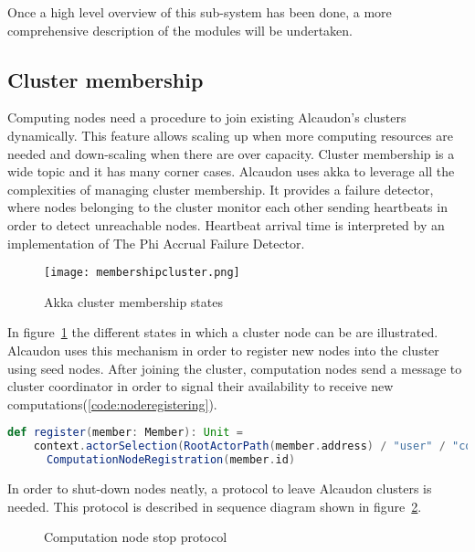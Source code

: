 Once a high level overview of this sub-system has been done, a more
comprehensive description of the modules will be undertaken.

\subsection{Cluster membership}

Computing nodes need a procedure to join existing Alcaudon's clusters
dynamically. This feature allows scaling up when more computing resources are
needed and down-scaling when there are over capacity. Cluster membership is a
wide topic and it has many corner cases. Alcaudon uses akka to leverage all the
complexities of managing cluster membership. It provides a failure detector,
where nodes belonging to the cluster monitor each other sending heartbeats in
order to detect unreachable nodes. Heartbeat arrival time is interpreted by an
implementation of The Phi Accrual Failure Detector\cite{phifailure}.

\begin{figure}[!h]
\begin{center}
\texttt{[image: membershipcluster.png]}
\caption{Akka cluster membership states\cite{akkastates}}
\label{fig:statescluster}
\end{center}
\end{figure}

In figure~\ref{fig:statescluster} the different states in which a cluster node
can be are illustrated. Alcaudon uses this mechanism in order to register new
nodes into the cluster using seed nodes. After joining the cluster, computation
nodes send a message to cluster coordinator in order to signal their
availability to receive new computations(\ref{code:noderegistering}).

\begin{lstlisting}[language=scala, frame=trBL, label=code:noderegistering, float=ht, caption = {Compute node registration}]
def register(member: Member): Unit =
    context.actorSelection(RootActorPath(member.address) / "user" / "coordinator") !
      ComputationNodeRegistration(member.id)
\end{lstlisting}

In order to shut-down nodes neatly, a protocol to leave Alcaudon clusters is
needed. This protocol is described in sequence diagram shown in
figure~\ref{fig:stopprotocol}.

\begin{figure}[!h]
  \centering
  \scalebox{0.45}{
    
  }
  \caption{Computation node stop protocol}
  \label{fig:stopprotocol}
\end{figure}

